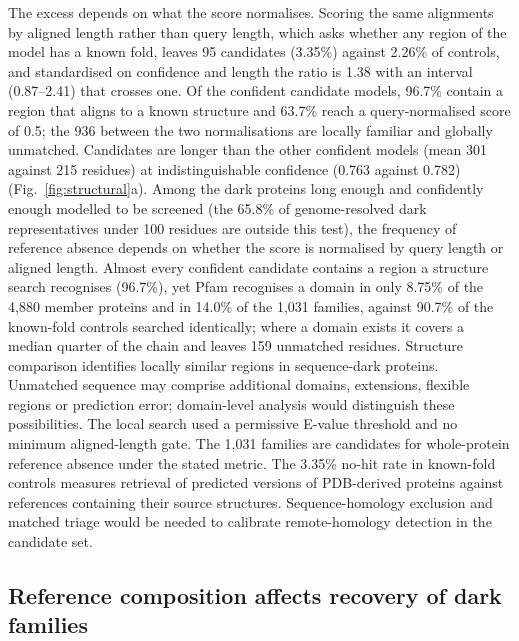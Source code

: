 \documentclass[11pt]{article}
\begin{document}
The excess depends on what the score normalises. Scoring the same alignments by aligned length
rather than query length, which asks whether any region of the model has a known fold, leaves 95
candidates (3.35\%) against 2.26\% of controls, and standardised on confidence and length the ratio is
1.38 with an interval (0.87--2.41) that crosses one. Of the confident candidate models,
96.7\% contain a region that aligns to a known structure and 63.7\% reach a query-normalised score of 0.5; the 936
between the two normalisations are locally familiar and globally unmatched. Candidates are longer
than the other confident models (mean 301 against 215 residues) at indistinguishable confidence
(0.763 against 0.782) (Fig.~\ref{fig:structural}a). Among the dark proteins long enough and
confidently enough modelled to be screened (the 65.8\% of genome-resolved dark representatives under 100 residues are
outside this test), the frequency of reference absence depends on whether the score is normalised by query length
or aligned length. Almost
every confident candidate contains a
region a structure search recognises (96.7\%), yet Pfam recognises a domain in only 8.75\% of the
4{,}880 member proteins and in 14.0\% of the 1{,}031 families, against 90.7\% of the known-fold
controls searched identically; where a domain exists it covers a median quarter of the chain and
leaves 159 unmatched residues. Structure comparison identifies locally similar regions in sequence-dark proteins. Unmatched
sequence may comprise additional domains, extensions, flexible regions or prediction error;
domain-level analysis would distinguish these possibilities. The local search used a permissive
E-value threshold and no minimum aligned-length gate. The 1{,}031 families are candidates for
whole-protein reference absence under the stated metric. The 3.35\% no-hit rate in known-fold
controls measures retrieval of predicted versions of PDB-derived proteins against references
containing their source structures. Sequence-homology exclusion and matched triage would be
needed to calibrate remote-homology detection in the candidate set.

\subsection*{Reference composition affects recovery of dark families}
\end{document}
